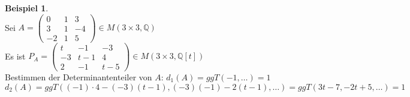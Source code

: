 \documentclass[10pt,a4paper,numbers=endperiod]{scrartcl}
\theoremstyle{definition}
\newtheorem{bsp}[satz]{Beispiel}
\def\QQ{{\mathbb Q}}
\begin{document}
\begin{bsp} 
	$ $\\
	Sei $A = \begin{pmatrix}
	0 & 1 & 3\\
	3 & 1 & -4\\
	-2 & 1 & 5
	\end{pmatrix} \in M(3 \times 3, \QQ)$\\
	Es ist $P_A = \begin{pmatrix}
	t & -1 & -3\\
	-3 & t-1 & 4\\
	2 & -1 & t-5
	\end{pmatrix} \in M(3 \times 3, \QQ[t])$\\
	Bestimmen der Determinantenteiler von $A$: $d_1(A) = ggT(-1, \ldots) = 1$\\
	$d_2(A) = ggT((-1) \cdot 4 - (-3)(t-1), (-3)(-1) - 2(t-1), \ldots) = ggT(3t - 7, -2t+5, \ldots) = 1$\\
	

\end{bsp}
\end{document}

